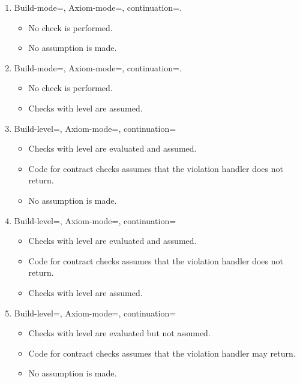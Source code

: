 \begin{enumerate}

\item Build-mode=, Axiom-mode=, continuation=.
\begin{itemize}
  \item No check is performed.
  \item No assumption is made.
\end{itemize}

\item Build-mode=, Axiom-mode=, continuation=.
\begin{itemize}
  \item No check is performed.
  \item Checks with  level are assumed.
\end{itemize}

\item Build-level=, Axiom-mode=, continuation=
\begin{itemize}
  \item Checks with  level are evaluated and assumed.
  \item Code for contract checks assumes that the violation handler does not return.
  \item No assumption is made.
\end{itemize}

\item Build-level=, Axiom-mode=, continuation=
\begin{itemize}
  \item Checks with  level are evaluated and assumed.
  \item Code for contract checks assumes that the violation handler does not return.
  \item Checks with  level are assumed.
\end{itemize}

\item Build-level=, Axiom-mode=, continuation=
\begin{itemize}
  \item Checks with  level are evaluated but not assumed.
  \item Code for contract checks assumes that the violation handler may return.
  \item No assumption is made.
\end{itemize}


\end{enumerate}
